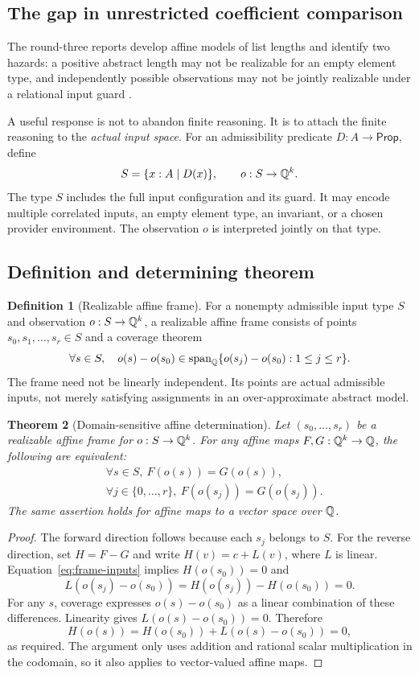\documentclass[11pt,letterpaper]{article}
\newtheorem{theorem}{Theorem}[section]
\theoremstyle{definition}\newtheorem{definition}[theorem]{Definition}
\theoremstyle{remark}\newtheorem{remark}[theorem]{Remark}
\begin{document}
\subsection{The gap in unrestricted coefficient comparison}
The round-three reports develop affine models of list lengths and identify
two hazards: a positive abstract length may not be realizable for an empty
element type, and independently possible observations may not be jointly
realizable under a relational input guard \cite{round3a,round3b}.

A useful response is not to abandon finite reasoning. It is to attach the
finite reasoning to the \emph{actual input space}. For an admissibility
predicate $D:A\to\mathsf{Prop}$, define
\[
 S=\{x:A\mid D(x)\},\qquad o:S\to\mathbb Q^k.
\]
The type $S$ includes the full input configuration and its guard. It may encode
multiple correlated inputs, an empty element type, an invariant, or a chosen
provider environment. The observation $o$ is interpreted jointly on that type.

\subsection{Definition and determining theorem}
\begin{definition}[Realizable affine frame]
For a nonempty admissible input type $S$ and observation $o:S\to\mathbb Q^k$, a
realizable affine frame consists of points $s_0,s_1,\ldots,s_r\in S$ and a
coverage theorem
\begin{equation}\label{eq:frame-cover}
 \forall s\in S,\quad
 o(s)-o(s_0)\in
 \operatorname{span}_{\mathbb Q}\{o(s_j)-o(s_0):1\le j\le r\}.
\end{equation}
The frame need not be linearly independent. Its points are actual admissible
inputs, not merely satisfying assignments in an over-approximate abstract model.
\end{definition}

\begin{theorem}[Domain-sensitive affine determination]\label{thm:frame}
Let $(s_0,\ldots,s_r)$ be a realizable affine frame for $o:S\to\mathbb Q^k$.
For any affine maps $F,G:\mathbb Q^k\to\mathbb Q$, the following are equivalent:
\begin{align}
 &\forall s\in S,\ F(o(s))=G(o(s)),\label{eq:all-inputs}\\
 &\forall j\in\{0,\ldots,r\},\ F(o(s_j))=G(o(s_j)).\label{eq:frame-inputs}
\end{align}
The same assertion holds for affine maps to a vector space over $\mathbb Q$.
\end{theorem}
\begin{proof}
The forward direction follows because each $s_j$ belongs to $S$. For the
reverse direction, set $H=F-G$ and write $H(v)=c+L(v)$, where $L$ is linear.
Equation~\eqref{eq:frame-inputs} implies $H(o(s_0))=0$ and
\[
 L(o(s_j)-o(s_0))=H(o(s_j))-H(o(s_0))=0.
\]
For any $s$, coverage expresses $o(s)-o(s_0)$ as a linear combination of these
differences. Linearity gives $L(o(s)-o(s_0))=0$. Therefore
\[
 H(o(s))=H(o(s_0))+L(o(s)-o(s_0))=0,
\]
as required. The argument only uses addition and rational scalar multiplication
in the codomain, so it also applies to vector-valued affine maps.
\end{proof}
\end{document}
